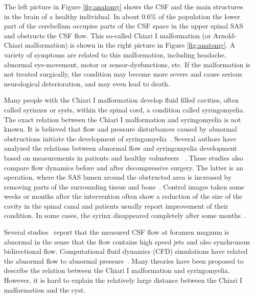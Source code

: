 The left picture in Figure \ref{fig:anatomy} shows the CSF and the
main structures in the brain of a healthy individual. In about 0.6\%
of the population the lower part of the cerebellum occupies parts of
the CSF space in the upper spinal SAS and obstructs the CSF flow. This
so-called Chiari I malformation  (or
Arnold-Chiari malformation) is
shown in the right picture in Figure \ref{fig:anatomy}. A variety of
symptoms are related to this malformation, including headache, abnormal
eye-movement, motor or sensor-dysfunctions, etc. If the malformation
is not treated surgically, the condition may become more severe and
cause serious neurological deterioration, and may even
lead to death. 

Many people with the Chiari I malformation develop
fluid filled cavities, often called syrinxes or systs, within the spinal cord,  a
condition called syringomyelia. The exact
relation between the Chiari I malformation and syringomyelia is
 not known. It is believed that flow and pressure disturbances caused by abnormal obstructions initiate the development of
syringomyelia~\citep{OldfieldMuraszkoShawkerEtAl1994}. Several authors have
analyzed the relations between abnormal flow and syringomyelia
development based on measurements in patients and healthy volunteers
~\citep{HeissPatronasDeVroomEtAl1999,PinnaAlessandriniAlfieriEtAl2000,HofmannWarmuth-MetzBendszusEtAl2000,HaughtonKorosecMedowEtAl2003}. These studies also compare flow dynamics before and after decompressive
surgery. The latter is an operation, where the SAS lumen around the
obstructed area is increased by removing parts of the surrounding
tissue and bone~\citep{MilhoratBolognese2003}. Control
images taken some weeks or months after the intervention often show a
reduction of the size of the cavity in the spinal canal and patients
usually report improvement of their condition. In some cases, the
syrinx disappeared completely after some
months~\citep{OldfieldMuraszkoShawkerEtAl1994,PinnaAlessandriniAlfieriEtAl2000,HeissPatronasDeVroomEtAl1999}.

Several studies~\citep{Quigley2004,HaughtonKorosecMedowEtAl2003} report that the measured CSF flow at foramen magnum
is abnormal in the sense that the flow contains high speed jets and also synchronous bidirectional flow. 
Computational fluid dynamics (CFD) simulations have related the abnormal flow to 
abnormal
pressure~\citep{RoldanHaughtonWiebenEtAl2008,HentschelMardalLovgren2010,LingeHaughtonLovgren2010,LingeHaughtonLovgren2011}.  
Many theories have been proposed to describe the relation between the Chiari I malformation and
syringomyelia. However, it is hard to explain the relatively large distance between the 
Chiari I malformation and the cyst.  

